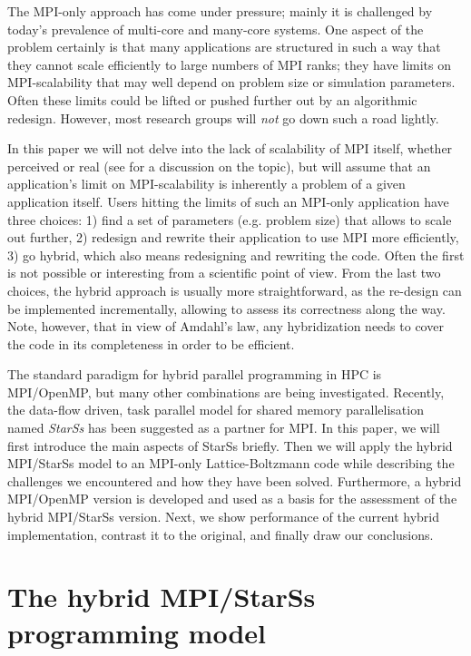 \documentclass[conference]{IEEEtran}
\newcommand{\starss}{{StarSs}}
\begin{document}
The MPI-only approach has come under pressure; mainly it is challenged by today's prevalence of
multi-core and many-core systems. One aspect of the problem
certainly is that many applications are structured in such a way that
they cannot scale efficiently to large numbers of MPI
ranks; they have limits on MPI-scalability that may well
depend on problem size or simulation parameters. Often these limits
could be lifted or pushed further out by an algorithmic
redesign. However, most research groups will \emph{not} go down such a road
lightly.

In this paper we will not delve into the lack of scalability of MPI
itself, whether perceived or real (see \cite{B+09} for a discussion on
  the topic), but will assume that an
application's limit on MPI-scalability is inherently a problem of a
given application itself. Users hitting the limits of such an MPI-only
application have three choices: 1) find a set of parameters
(e.g. problem size) that allows to scale out further, 2) redesign and
rewrite their application to use MPI more efficiently, 3) go hybrid,
which also means redesigning and rewriting the code. Often the first
is not possible or interesting from a scientific point of view.  From
the last two choices, the hybrid approach is usually more straightforward, as
the re-design can be implemented incrementally, allowing to
assess its correctness along the way. Note, however, that in view of
Amdahl's law, any hybridization needs to cover the code in its
completeness in order to be efficient.

The standard paradigm for hybrid parallel programming in HPC is MPI/OpenMP,
but many other combinations are being investigated. Recently, the data-flow
driven, task parallel model for shared memory parallelisation named
\emph{\starss{}} has been suggested as a partner for MPI. In this paper, we
will first introduce the main aspects of \starss{} briefly. Then we will
apply the hybrid MPI/\starss{} model to an MPI-only Lattice-Boltzmann code
while describing the challenges we encountered and how they have been solved.
Furthermore, a hybrid MPI/OpenMP version is developed and used as a basis 
for the assessment of the hybrid MPI/\starss{} version.
Next, we show performance of the current hybrid implementation, contrast it
to the original, and finally draw our conclusions.


\section{The hybrid MPI/\starss{} programming model}
\end{document}
